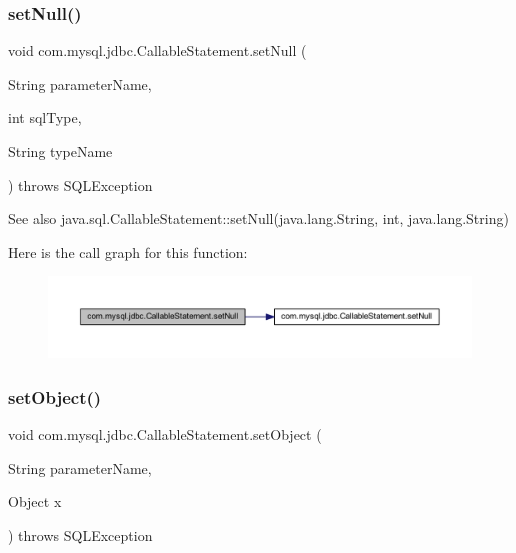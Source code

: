 \subsubsection{\texorpdfstring{set\+Null()}{setNull()}\hspace{0.1cm}{\footnotesize\ttfamily [2/2]}}
{\footnotesize\ttfamily void com.\+mysql.\+jdbc.\+Callable\+Statement.\+set\+Null (\begin{DoxyParamCaption}\item[{String}]{parameter\+Name,  }\item[{int}]{sql\+Type,  }\item[{String}]{type\+Name }\end{DoxyParamCaption}) throws S\+Q\+L\+Exception}

\begin{DoxySeeAlso}{See also}
java.\+sql.\+Callable\+Statement\+::set\+Null(java.\+lang.\+String, int, java.\+lang.\+String) 
\end{DoxySeeAlso}
Here is the call graph for this function\+:\nopagebreak
\begin{figure}[H]
\begin{center}
\leavevmode
\includegraphics[width=350pt]{classcom_1_1mysql_1_1jdbc_1_1_callable_statement_a7b65000fc5f68bdce16ea0f9a609948b_cgraph}
\end{center}
\end{figure}
\mbox{\label{classcom_1_1mysql_1_1jdbc_1_1_callable_statement_a82522267faf9a0ffc45dcba28b0fabd9}} 
\subsubsection{\texorpdfstring{set\+Object()}{setObject()}\hspace{0.1cm}{\footnotesize\ttfamily [1/3]}}
{\footnotesize\ttfamily void com.\+mysql.\+jdbc.\+Callable\+Statement.\+set\+Object (\begin{DoxyParamCaption}\item[{String}]{parameter\+Name,  }\item[{Object}]{x }\end{DoxyParamCaption}) throws S\+Q\+L\+Exception}

